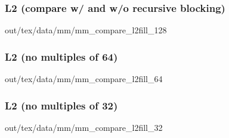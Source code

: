 \documentclass[12pt,dvipdfmx]{beamer}
\begin{document}
\begin{frame}
\frametitle{L2 (compare w/ and w/o recursive blocking)}
\begin{center}
\def\svgwidth{0.8\textwidth}  
out/tex/data/mm/mm\_compare\_l2fill\_128
\end{center}
\end{frame}

\begin{frame}
\frametitle{L2 (no multiples of 64)}
\begin{center}
\def\svgwidth{0.8\textwidth}  
out/tex/data/mm/mm\_compare\_l2fill\_64
\end{center}
\end{frame}


\begin{frame}
\frametitle{L2 (no multiples of 32)}
\begin{center}
\def\svgwidth{0.8\textwidth}  
out/tex/data/mm/mm\_compare\_l2fill\_32
\end{center}
\end{frame}


\end{document}
